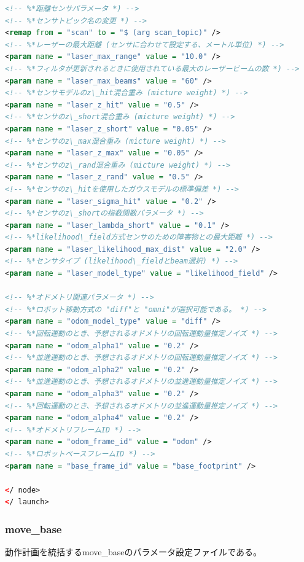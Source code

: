 \begin{lstlisting}[language=XML]
<!-- %*距離センサパラメータ *) -->
<!-- %*センサトピック名の変更 *) -->
<remap from = "scan" to = "$ (arg scan_topic)" />
<!-- %*レーザーの最大距離 (センサに合わせて設定する、メートル単位) *) -->
<param name = "laser_max_range" value = "10.0" />
<!-- %*フィルタが更新されるときに使用されている最大のレーザービームの数 *) -->
<param name = "laser_max_beams" value = "60" />
<!-- %*センサモデルのz\_hit混合重み (micture weight) *) -->
<param name = "laser_z_hit" value = "0.5" />
<!-- %*センサのz\_short混合重み (micture weight) *) -->
<param name = "laser_z_short" value = "0.05" />
<!-- %*センサのz\_max混合重み (micture weight) *) -->
<param name = "laser_z_max" value = "0.05" />
<!-- %*センサのz\_rand混合重み (micture weight) *) -->
<param name = "laser_z_rand" value = "0.5" />
<!-- %*センサのz\_hitを使用したガウスモデルの標準偏差 *) -->
<param name = "laser_sigma_hit" value = "0.2" />
<!-- %*センサのz\_shortの指数関数パラメータ *) -->
<param name = "laser_lambda_short" value = "0.1" />
<!-- %*likelihood\_field方式センサのための障害物との最大距離 *) -->
<param name = "laser_likelihood_max_dist" value = "2.0" />
<!-- %*センサタイプ (likelihood\_fieldとbeam選択) *) -->
<param name = "laser_model_type" value = "likelihood_field" />

<!-- %*オドメトリ関連パラメータ *) -->
<!-- %*ロボット移動方式の "diff"と "omni"が選択可能である。 *) -->
<param name = "odom_model_type" value = "diff" />
<!-- %*回転運動のとき、予想されるオドメトリの回転運動量推定ノイズ *) -->
<param name = "odom_alpha1" value = "0.2" />
<!-- %*並進運動のとき、予想されるオドメトリの回転運動量推定ノイズ *) -->
<param name = "odom_alpha2" value = "0.2" />
<!-- %*並進運動のとき、予想されるオドメトリの並進運動量推定ノイズ *) -->
<param name = "odom_alpha3" value = "0.2" />
<!-- %*回転運動のとき、予想されるオドメトリの並進運動量推定ノイズ *) -->
<param name = "odom_alpha4" value = "0.2" />
<!-- %*オドメトリフレームID *) -->
<param name = "odom_frame_id" value = "odom" />
<!-- %*ロボットベースフレームID *) -->
<param name = "base_frame_id" value = "base_footprint" />

</ node>
</ launch>
\end{lstlisting}

\subsubsection{move\_base}

動作計画を統括するmove\_baseのパラメータ設定ファイルである。

